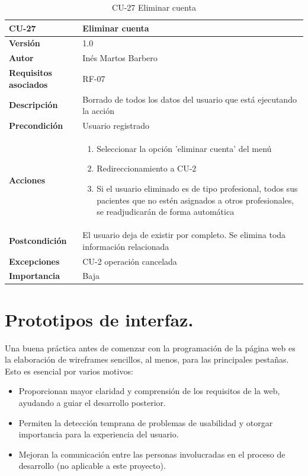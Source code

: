 \begin{table}[p]
	\centering
	\begin{tabularx}{\linewidth}{ p{} p{} }
		\toprule
		\textbf{CU-27}    & \textbf{Eliminar cuenta}\\
		\toprule
		\textbf{Versión}              & 1.0    \\
		\textbf{Autor}                & Inés Martos Barbero \\
		\textbf{Requisitos asociados} & RF-07 \\
		\textbf{Descripción}          & Borrado de todos los datos del usuario que está ejecutando la acción \\
		\textbf{Precondición}         & Usuario registrado \\
		\textbf{Acciones}             &
		\begin{enumerate}
			\def\labelenumi{\arabic{enumi}.}
			\tightlist
			\item Seleccionar la opción 'eliminar cuenta' del menú
            \item Redireccionamiento a CU-2 
			\item Si el usuario eliminado es de tipo profesional, todos sus pacientes que no estén asignados a otros profesionales, se readjudicarán de forma automática
		\end{enumerate}\\
		\textbf{Postcondición}        & El usuario deja de existir por completo. Se elimina toda información relacionada \\
		\textbf{Excepciones}          & CU-2 operación cancelada \\
		\textbf{Importancia}          & Baja \\
		\bottomrule
	\end{tabularx}
	\caption{CU-27 Eliminar cuenta}
    \label{CU-27}
\end{table}


\section{Prototipos de interfaz.}
Una buena práctica antes de comenzar con la programación de la página web es la elaboración de wireframes sencillos, al menos, para las principales pestañas. Esto es esencial por varios motivos: 
\begin{itemize}
    \item Proporcionan mayor claridad y comprensión de los requisitos de la web, ayudando a guiar el desarrollo posterior.
    \item Permiten la detección temprana de problemas de usabilidad y otorgar importancia para la experiencia del usuario.
    \item Mejoran la comunicación entre las personas involucradas en el proceso de desarrollo (no aplicable a este proyecto).
\end{itemize}

